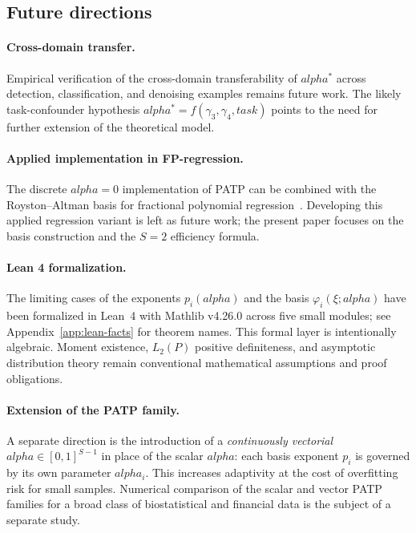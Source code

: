 \documentclass[11pt]{article}
\def\alpha{alpha}%
\def\vec#1{#1}%
\def\mathrm#1{#1}%
\theoremstyle{definition}
\begin{document}
\subsection{Future directions}\label{sec:disc:future}

\paragraph{Cross-domain transfer.}
Empirical verification of the cross-domain transferability of $\alpha^{*}$
across detection, classification, and denoising examples remains future work.
The likely task-confounder hypothesis
$\alpha^{*} = f(\gamma_3, \gamma_4, \mathrm{task})$ points to the need for
further extension of the theoretical model.

\paragraph{Applied implementation in FP-regression.}
The discrete $\alpha = 0$ implementation of PATP can be combined with the
Royston--Altman basis for fractional polynomial regression~\citep{royston1994}.
Developing this applied regression variant is left as future work; the present
paper focuses on the basis construction and the $S=2$ efficiency formula.

\paragraph{Lean 4 formalization.}
The limiting cases of the exponents $p_i(\alpha)$ and the basis
$\varphi_i(\xi; \alpha)$ have been formalized in Lean~4 with Mathlib v4.26.0
across five small modules; see Appendix~\ref{app:lean-facts} for theorem
names. This formal layer is intentionally algebraic. Moment existence,
$L_2(P)$ positive definiteness, and asymptotic distribution theory remain
conventional mathematical assumptions and proof obligations.

\paragraph{Extension of the PATP family.}
A separate direction is the introduction of a \emph{continuously vectorial}
$\vec\alpha \in [0,1]^{S-1}$ in place of the scalar $\alpha$: each basis
exponent $p_i$ is governed by its own parameter $\alpha_i$. This increases
adaptivity at the cost of overfitting risk for small samples. Numerical
comparison of the scalar and vector PATP families for a broad class of
biostatistical and financial data is the subject of a separate study.
\end{document}
